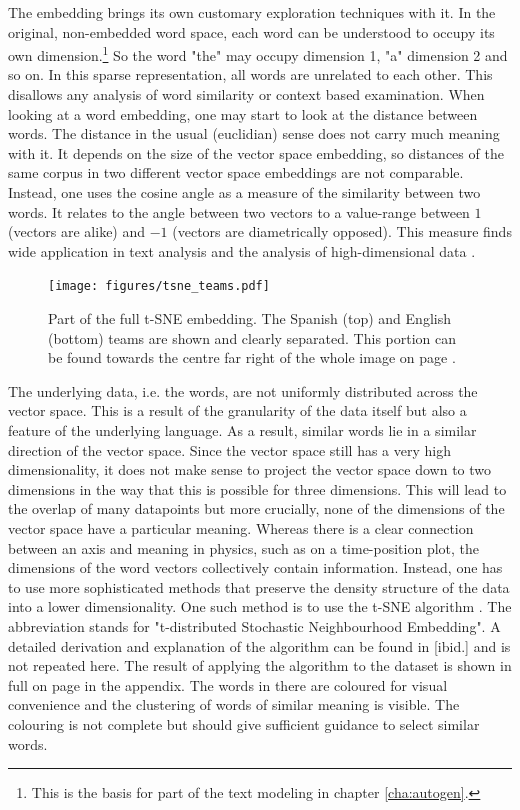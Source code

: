 \documentclass[10pt, a4paper]{UUThesisTemplate}
\begin{document}
The embedding brings its own customary exploration techniques with it. In the original, non-embedded word space, each word can be understood to occupy its own dimension.\footnote{This is the basis for part of the text modeling in chapter \ref{cha:autogen}.} So the word "the" may occupy dimension 1, "a" dimension 2 and so on. In this sparse representation, all words are unrelated to each other. This disallows any analysis of word similarity or context based examination. When looking at a word embedding, one may start to look at the distance between words. The distance in the usual (euclidian) sense does not carry much meaning with it. It depends on the size of the vector space embedding, so distances of the same corpus in two different vector space embeddings are not comparable. Instead, one uses the cosine angle as a measure of the similarity between two words. It relates to the angle between two vectors to a value-range between $1$ (vectors are alike) and $-1$ (vectors are diametrically opposed). This measure finds wide application in text analysis and the analysis of high-dimensional data \cite{inforet}.

\begin{figure}\hspace{-1cm}
\texttt{[image: figures/tsne\_teams.pdf]}
\caption{Part of the full t-SNE embedding. The Spanish (top) and English (bottom) teams are shown and clearly separated. This portion can be found towards the centre far right of the whole image on page \pageref{fig:tSNE}.}\label{fig:tsneteams}
\end{figure}

The underlying data, i.e. the words, are not uniformly distributed across the vector space. This is a result of the granularity of the data itself but also a feature of the underlying language. As a result, similar words lie in a similar direction of the vector space. Since the vector space still has a very high dimensionality, it does not make sense to project the vector space down to two dimensions in the way that this is possible for three dimensions. This will lead to the overlap of many datapoints but more crucially, none of the dimensions of the vector space have a particular meaning. Whereas there is a clear connection between an axis and meaning in physics, such as on a time-position plot, the dimensions of the word vectors collectively contain information. Instead, one has to use more sophisticated methods that preserve the density structure of the data into a lower dimensionality. One such method is to use the t-SNE algorithm \cite{t-SNE}. The abbreviation stands for "t-distributed Stochastic Neighbourhood Embedding". A detailed derivation and explanation of the algorithm can be found in [ibid.] and is not repeated here. The result of applying the algorithm to the dataset is shown in full on page \pageref{fig:tSNE} in the appendix. The words in there are coloured for visual convenience and the clustering of words of similar meaning is visible. The colouring is not complete but should give sufficient guidance to select similar words. 
\end{document}
